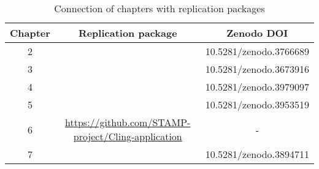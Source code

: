 \begin{table}[!t]
    \begin{center}
        
    \footnotesize
    \caption{Connection of chapters with replication packages}
    \label{tab:replicationpackages}
    \begin{tabular}{|c||c|c|}
    \textbf{Chapter} & \textbf{Replication package} & \textbf{Zenodo DOI}\\
    \hline
    \hline
    2 & \cite{zenodoJCrashPack}& 10.5281/zenodo.3766689 \\
    3 & \cite{pouria_derakhshanfar_2019_3673916}& 10.5281/zenodo.3673916 \\
    4 & \cite{zenodoRP}& 10.5281/zenodo.3979097 \\
    5 & \cite{derakhshanfar_pouria_2020_3953519}& 10.5281/zenodo.3953519\\
    6 & \url{https://github.com/STAMP-project/Cling-application}& - \\
    7 & \cite{evers_bjorn_2020_3894711}& 10.5281/zenodo.3894711\\
    \hline
    \end{tabular}
\end{center}
    \end{table}












